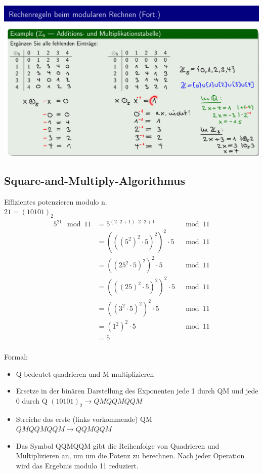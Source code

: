 \documentclass[12pt]{scrartcl}
\begin{document}
\includegraphics[width=14cm]{img/modulare_rechenregeln2.png}

\newpage
\subsection{Square-and-Multiply-Algorithmus}
Effizientes potenzieren modulo n.\\

$21 = (10101)_2$\\

\begin{align*}
    5^{21} \mod 11  &= 5^{(2 \cdot 2 + 1) \cdot 2 \cdot 2 + 1} &\mod 11\\
                    &= (((5^2)^2 \cdot 5)^2)^2 \cdot 5 &\mod 11\\
                    &= ((25^2 \cdot 5)^2)^2 \cdot 5 &\mod 11\\
                    &= (((25)^2 \cdot 5)^2)^2 \cdot 5 &\mod 11\\
                    &= ((3^2 \cdot 5)^2)^2 \cdot 5 &\mod 11\\
                    &= (1^2)^2 \cdot 5 &\mod 11\\
                    &= 5\\
\end{align*}

Formal:\\
\begin{itemize}
    \item Q bedeutet quadrieren und M multiplizieren
    \item Ersetze in der binären Darstellung des Exponenten jede 1 durch QM und jede 0
    durch Q $(10101)_2 \rightarrow QMQQMQQM$
    \item Streiche das erste (links vorkommende) QM\\
    $QMQQMQQM \rightarrow QQMQQM$
    \item Das Symbol QQMQQM gibt die Reihenfolge von Quadrieren und Multiplizieren an, um
    um die Potenz zu berechnen. Nach jeder Operation wird das Ergebnis modulo 11 reduziert.
\end{itemize}
\end{document}

